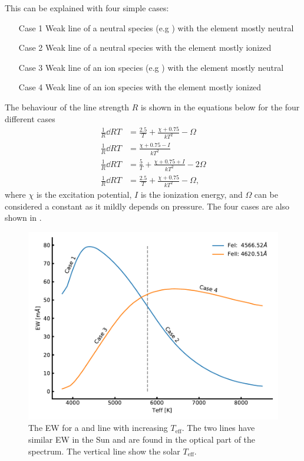 {This can be explained with four simple cases:
\begin{itemize}
  \item[Case 1] Weak line of a neutral species (e.g ) with the element mostly neutral
  \item[Case 2] Weak line of a neutral species with the element mostly ionized
  \item[Case 3] Weak line of an ion species (e.g ) with the element mostly neutral
  \item[Case 4] Weak line of an ion species with the element mostly ionized
\end{itemize}
The behaviour of the line strength $R$ is shown in the equations below for the four different cases
\begin{align}
  \frac{1}{R}\dd{R}{T} &= \frac{2.5}{T} + \frac{\chi+0.75}{kT^2}-\Omega  \tag*{Case 1} \\
  \frac{1}{R}\dd{R}{T} &= \frac{\chi+0.75-I}{kT^2}                       \tag*{Case 2} \\
  \frac{1}{R}\dd{R}{T} &= \frac{5}{T} + \frac{\chi+0.75+I}{kT^2}-2\Omega \tag*{Case 3} \\
  \frac{1}{R}\dd{R}{T} &= \frac{2.5}{T} + \frac{\chi+0.75}{kT^2}-\Omega, \tag*{Case 4}
\end{align}
where $\chi$ is the excitation potential, $I$ is the ionization energy, and $\Omega$ can be
considered a constant as it mildly depends on pressure. The four cases are also shown in
.

\begin{figure}[htpb!]
    \centering
    \includegraphics[width=0.85\linewidth]{figures/ewTeff.pdf}
    \caption{The EW for a  and  line with increasing $T_\mathrm{eff}$. The
             two lines have similar EW in the Sun and are found in the optical part of the spectrum.
             The vertical line show the solar $T_\mathrm{eff}$.}
    \label{fig:ewTeff}
\end{figure}


}
